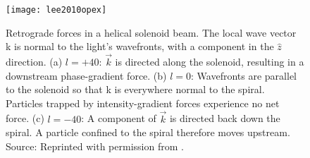 \begin{figure}[t!]
  \centering
  \texttt{[image: lee2010opex]}
  \caption{Retrograde forces in a helical solenoid beam. The local wave vector k is normal to the light's wavefronts, with a component in the $\hat{z}$ direction. (a) $l = +40$: $\vec{k}$ is directed along the solenoid, resulting in a downstream phase-gradient force. (b) $l = 0$: Wavefronts are parallel to the solenoid so that k is everywhere normal to the spiral. Particles trapped by intensity-gradient forces experience no net force. (c) $l = -40$: A component of $\vec{k}$ is directed back down the spiral. A particle confined to the spiral therefore moves upstream. Source: Reprinted with permission from \cite{Lee:10}.}
  \label{fig:solenoid wavefronts}
\end{figure}


